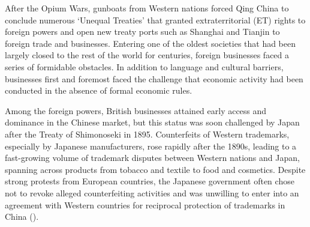 \documentclass[12pt]{article}
\begin{document}
After the Opium Wars, gunboats from Western nations forced Qing China to conclude numerous `Unequal Treaties' that granted extraterritorial (ET) rights to foreign powers and open new treaty ports such as Shanghai and Tianjin to foreign trade and businesses. Entering one of the oldest societies that had been largely closed to the rest of the world for centuries, foreign businesses faced a series of formidable obstacles. In addition to language and cultural barriers, businesses first and foremost faced the challenge that economic activity had been conducted in the absence of formal economic rules. 

Among the foreign powers, British businesses attained early access and dominance in the Chinese market, but this status was soon challenged by Japan after the Treaty of Shimonoseki in 1895. Counterfeits of Western trademarks, especially by Japanese manufacturers, rose rapidly after the 1890s, leading to a fast-growing volume of trademark disputes between Western nations and Japan, spanning across products from tobacco and textile to food and cosmetics. Despite strong protests from European countries, the Japanese government often chose not to revoke alleged counterfeiting activities and was unwilling to enter into an agreement with Western countries for reciprocal protection of trademarks in China (\citealp{PatentTrademarkReview1907}).



\end{document}
